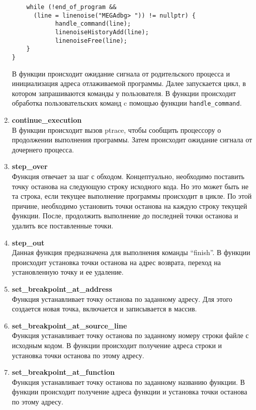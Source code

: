 \documentclass[oneside,final,14pt]{extreport}
\begin{document}
\begin{enumerate}
\begin{lstlisting}
    while (!end_of_program && 
      (line = linenoise("MEGAdbg> ")) != nullptr) {
            handle_command(line);
            linenoiseHistoryAdd(line);
            linenoiseFree(line);
    }
}
	\end{lstlisting}
	В функции происходит ожидание сигнала от родительского процесса и инициализация адреса отлаживаемой программы. Далее запускается цикл, в котором запрашиваются команды у пользователя.
	В функции происходит обработка пользовательских команд c помощью функции \verb:handle_command:.
	\item {\bf continue\_execution}\\
	В функции происходит вызов ptrace, чтобы сообщить процессору о продолжении выполнения программы. Затем происходит ожидание сигнала от дочернего процесса. 
	\item  {\bf step\_over} \\
	Функция отвечает за шаг с обходом. Концептуально, необходимо поставить точку останова на следующую строку исходного кода. Но это может быть не та строка, если текущее выполнение программы происходит в цикле. По этой причине, необходимо установить точки останова на каждую строку текущей функции. После, продолжить выполнение до последней точки останова и удалить все поставленные точки. 
	\item {\bf step\_out} \\
	Данная функция предназначена для выполнения команды “finish”. В функции происходит установка точки останова на адрес возврата, переход на установленную точку и ее удаление. 
	\item {\bf set\_breakpoint\_at\_address}\\
	Функция устанавливает точку останова по заданному адресу. Для этого создается новая точка, включается и записывается в массив.
	\item  
	{\bf set\_breakpoint\_at\_source\_line}\\
	Функция устанавливает точку останова по заданному номеру строки файле с исходным кодом. В функции происходит получение адреса строки и установка точки останова по этому адресу. 
	\item 
    {\bf set\_breakpoint\_at\_function}\\
	Функция устанавливает точку останова по заданному названию функции. В функции происходит получение адреса функции и установка точки останова по этому адресу.
	\end{enumerate}
\end{document}
